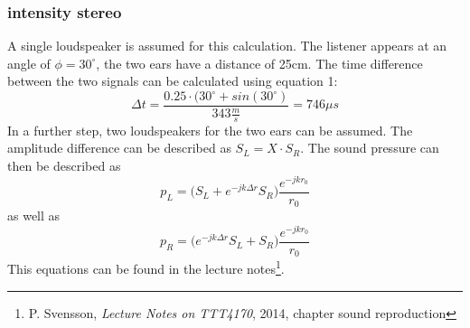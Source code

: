 \documentclass{article}
\begin{document}
\subsubsection{intensity stereo}
A single loudspeaker is assumed for this calculation. The listener appears at an angle of $\phi=30^\circ$, the two ears have a distance of 25cm. The time difference between the two signals can be calculated using equation 1:
$$\Delta t=\frac{0.25\cdot(30^\circ+sin(30^\circ)}{343\frac{m}{s}}=746\mu s$$
In a further step, two loudspeakers for the two ears can be assumed. The amplitude difference can be described as $S_L=X\cdot S_R$. The sound pressure can then be described as
\begin{equation}
p_L=\big(S_L+e^{-jk\Delta r}S_R\big)\frac{e^{-jkr_0}}{r_0}
\end{equation}
as well as 
\begin{equation}
p_R=\big(e^{-jk\Delta r}S_L+S_R\big)\frac{e^{-jkr_0}}{r_0}
\end{equation}
This equations can be found in the lecture notes\footnote{P. Svensson, \textit{Lecture Notes on TTT4170}, 2014, chapter sound reproduction}.
\end{document}
